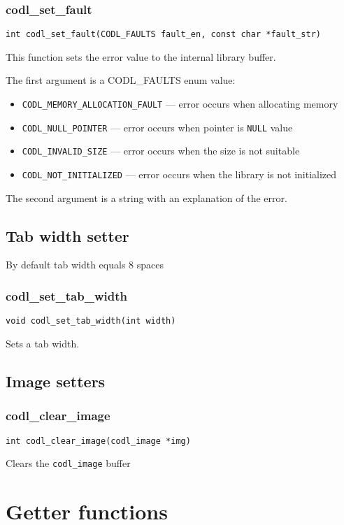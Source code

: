 \documentclass{article}
\newcommand{\fstep}{\vspace{3mm}\noindent}
\begin{document}
\subsubsection{codl\_set\_fault}
{\tt int codl\_set\_fault(CODL\_FAULTS fault\_en, const char *fault\_str)}

\fstep{} This function sets the error value to the internal library buffer.

The first argument is a CODL\_FAULTS enum value:
\begin{itemize}
\item{{\tt CODL\_MEMORY\_ALLOCATION\_FAULT} --- error occurs when allocating memory}
\item{{\tt CODL\_NULL\_POINTER} --- error occurs when pointer is {\tt NULL} value}
\item{{\tt CODL\_INVALID\_SIZE} --- error occurs when the size is not suitable}
\item{{\tt CODL\_NOT\_INITIALIZED} --- error occurs when the library is not initialized}
\end{itemize}

The second argument is a string with an explanation of the error.

\subsection{Tab width setter}
By default tab width equals 8 spaces

\subsubsection{codl\_set\_tab\_width}
{\tt void codl\_set\_tab\_width(int width)}

\fstep{} Sets a tab width.

\subsection{Image setters}
\subsubsection{codl\_clear\_image}
{\tt int codl\_clear\_image(codl\_image *img)}

\fstep{} Clears the {\tt codl\_image} buffer

\section{Getter functions}
\end{document}
